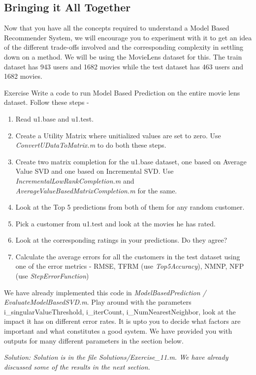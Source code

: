   \subsection{Bringing it All Together}
  Now that you have all the concepts required to understand a Model Based Recommender System, we will encourage you to experiment with it to get an idea of the different trade-offs involved and the corresponding complexity in settling down on a method. We will be using the MovieLens dataset for this. The train dataset has 943 users and 1682 movies while the test dataset has 463 users and 1682 movies. 
\begin{myremark}{Exercise }
Write a code to run Model Based Prediction on the entire movie lens dataset. Follow these steps - 
\begin{enumerate}
\item Read u1.base and u1.test. 
\item Create a Utility Matrix where unitialized values are set to zero. Use \textit{ConvertUDataToMatrix.m} to do both these steps.
\item Create two matrix completion for the u1.base dataset, one based on Average Value SVD and one based on Incremental SVD. Use \textit{IncrementalLowRankCompletion.m} and \textit{AverageValueBasedMatrixCompletion.m} for the same.
\item Look at the Top 5 predictions from both of them for any random customer.
\item Pick a customer from u1.test and look at the movies he has rated. 
\item Look at the corresponding ratings in your predictions. Do they agree?
\item Calculate the average errors for all the customers in the test dataset using one of the error metrics - RMSE, TFRM (use \textit{Top5Accuracy}), NMNP, NFP (use \textit{StepErrorFunction})
\end{enumerate}
We have already implemented this code in \textit{ModelBasedPrediction / EvaluateModelBasedSVD.m}. Play around with the parameters {i\_singularValueThreshold, i\_iterCount, i\_NumNearestNeighbor}, look at the impact it has on different error rates. It is upto you to decide what factors are important and what constitutes a good system. We have provided you with outputs for many different parameters in the section below.
\end{myremark}
\textit{Solution: Solution is in the file Solutions/Exercise\_11.m. We have already discussed some of the results in the next section.}

